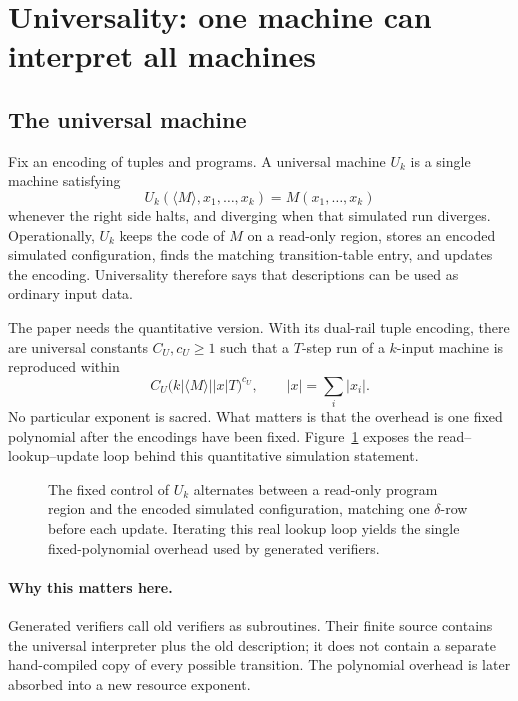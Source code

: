 \section{Universality: one machine can interpret all machines}
\label{sec:refresher-universality}

\subsection{The universal machine}

Fix an encoding of tuples and programs.  A universal machine \(U_k\) is a
single machine satisfying
\[
 U_k(\langle M\rangle,x_1,\ldots,x_k)=M(x_1,\ldots,x_k)
\]
whenever the right side halts, and diverging when that simulated run diverges.
Operationally, \(U_k\) keeps the code of \(M\) on a read-only region, stores an
encoded simulated configuration, finds the matching transition-table entry,
and updates the encoding.  Universality therefore says that descriptions can
be used as ordinary input data.

The paper needs the quantitative version.  With its dual-rail tuple encoding,
there are universal constants \(C_U,c_U\geq1\) such that a \(T\)-step run of a
\(k\)-input machine is reproduced within
\[
 C_U\bigl(k|\langle M\rangle||x|T\bigr)^{c_U},
 \qquad |x|=\sum_i|x_i|.
\]
No particular exponent is sacred.  What matters is that the overhead is one
fixed polynomial after the encodings have been fixed.
Figure~\ref{fig:universal-machine} exposes the read--lookup--update loop behind
this quantitative simulation statement.

\begin{figure}[t]
\centering

\caption{The fixed control of \(U_k\) alternates between a read-only program region and the encoded simulated configuration, matching one \(\delta\)-row before each update.  Iterating this real lookup loop yields the single fixed-polynomial overhead used by generated verifiers.}
\label{fig:universal-machine}
\end{figure}

\paragraph{Why this matters here.}
Generated verifiers call old verifiers as subroutines.  Their finite source
contains the universal interpreter plus the old description; it does not
contain a separate hand-compiled copy of every possible transition.  The
polynomial overhead is later absorbed into a new resource exponent.

